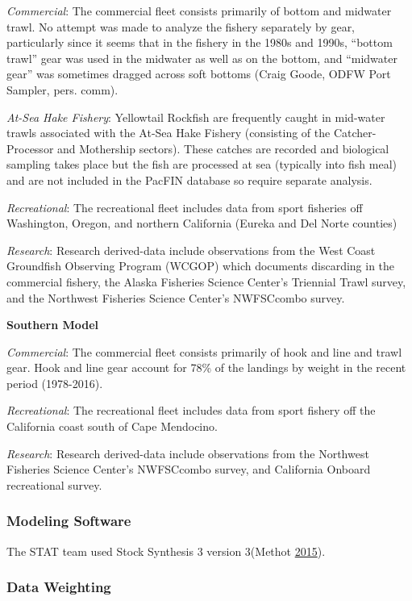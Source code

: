 \documentclass[12pt,]{article}
\begin{document}
\emph{Commercial}: The commercial fleet consists primarily of bottom and
midwater trawl. No attempt was made to analyze the fishery separately by
gear, particularly since it seems that in the fishery in the 1980s and
1990s, ``bottom trawl'' gear was used in the midwater as well as on the
bottom, and ``midwater gear'' was sometimes dragged across soft bottoms
(Craig Goode, ODFW Port Sampler, pers. comm).

\emph{At-Sea Hake Fishery}: Yellowtail Rockfish are frequently caught in
mid-water trawls associated with the At-Sea Hake Fishery (consisting of
the Catcher-Processor and Mothership sectors). These catches are
recorded and biological sampling takes place but the fish are processed
at sea (typically into fish meal) and are not included in the PacFIN
database so require separate analysis.

\emph{Recreational}: The recreational fleet includes data from sport
fisheries off Washington, Oregon, and northern California (Eureka and
Del Norte counties)

\emph{Research}: Research derived-data include observations from the
West Coast Groundfish Observing Program (WCGOP) which documents
discarding in the commercial fishery, the Alaska Fisheries Science
Center's Triennial Trawl survey, and the Northwest Fisheries Science
Center's NWFSCcombo survey.

\textbf{Southern Model}

\emph{Commercial}: The commercial fleet consists primarily of hook and
line and trawl gear. Hook and line gear account for 78\% of the landings
by weight in the recent period (1978-2016).

\emph{Recreational}: The recreational fleet includes data from sport
fishery off the California coast south of Cape Mendocino.

\emph{Research}: Research derived-data include observations from the
Northwest Fisheries Science Center's NWFSCcombo survey, and California
Onboard recreational survey.

\subsubsection{Modeling Software}\label{modeling-software}

The STAT team used Stock Synthesis 3 version 3(Methot
\protect\hyperlink{ref-Methot2015}{2015}).

\subsubsection{Data Weighting}\label{data-weighting}
\end{document}
